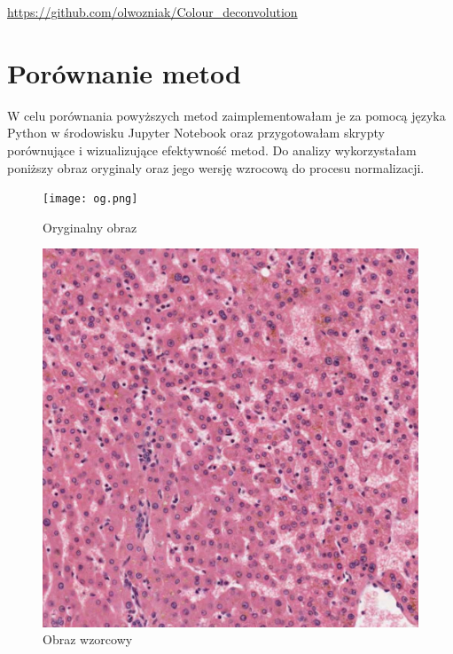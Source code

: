 \documentclass{article}
\begin{document}
\begin{center}
\url{https://github.com/olwozniak/Colour_deconvolution}
\end{center}


\section{Porównanie metod}
W celu porównania powyższych metod zaimplementowałam je za pomocą języka Python w środowisku Jupyter Notebook oraz przygotowałam skrypty porównujące i wizualizujące efektywność metod. Do analizy wykorzystałam poniższy obraz oryginaly oraz jego wersję wzrocową do procesu normalizacji.

\begin{figure}[htbp]
    \centering
    \begin{minipage}{0.45\textwidth}
        \centering
        \texttt{[image: og.png]} %
        \caption{Oryginalny obraz}
        \label{fig:og}
    \end{minipage}
    \hfill
    \begin{minipage}{0.45\textwidth}
        \centering
        \includegraphics[width=\linewidth]{target.png} %
        \caption{Obraz wzorcowy}
        \label{fig:target}
    \end{minipage}
\end{figure}
\end{document}
